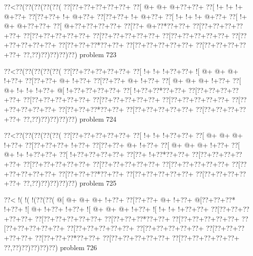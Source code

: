 \vbox{\vbox{\goo
\0??<\0??(\0??(\0??(\0??(\0??(
\0??[\0??+\0??+\0??+\0??+\0??+
\0??[\- @+\- @+\- @+\0??+\0??+
\0??[\- !+\- !+\- !+\- @+\0??+
\0??[\0??+\0??+\- !+\- @+\0??+
\0??[\0??+\0??+\- !+\- @+\0??+
\0??[\- !+\- !+\- !+\- @+\0??+
\0??[\- !+\- @+\- @+\0??+\0??+
\0??[\- @+\0??+\0??+\0??+\0??+
\0??[\0??+\- @+\0??*\0??+\0??+
\0??[\0??+\0??+\0??+\0??+\0??+
\0??[\0??+\0??+\0??+\0??+\0??+
\0??[\0??+\0??+\0??+\0??+\0??+
\0??[\0??+\0??+\0??+\0??+\0??+
\0??[\0??+\0??+\0??+\0??+\0??+
\0??[\0??+\0??+\0??*\0??+\0??+
\0??[\0??+\0??+\0??+\0??+\0??+
\0??[\0??+\0??+\0??+\0??+\0??+
\0??,\0??)\0??)\0??)\0??)\0??)
}
\hfil problem 723\hfil\break
}

\vbox{\vbox{\goo
\0??<\0??(\0??(\0??(\0??(\0??(
\0??[\0??+\0??+\0??+\0??+\0??+
\0??[\- !+\- !+\- !+\0??+\0??+
\- ![\- @+\- @+\- @+\- !+\0??+
\0??[\0??+\0??+\- @+\- !+\0??+
\0??[\0??+\0??+\- @+\- !+\0??+
\0??[\- @+\- @+\- @+\- !+\0??+
\0??[\- @+\- !+\- !+\- !+\0??+
\- @[\- !+\0??+\0??+\0??+\0??+
\0??[\- !+\0??+\0??*\0??+\0??+
\0??[\0??+\0??+\0??+\0??+\0??+
\0??[\0??+\0??+\0??+\0??+\0??+
\0??[\0??+\0??+\0??+\0??+\0??+
\0??[\0??+\0??+\0??+\0??+\0??+
\0??[\0??+\0??+\0??+\0??+\0??+
\0??[\0??+\0??+\0??*\0??+\0??+
\0??[\0??+\0??+\0??+\0??+\0??+
\0??[\0??+\0??+\0??+\0??+\0??+
\0??,\0??)\0??)\0??)\0??)\0??)
}
\hfil problem 724\hfil\break
}

\vbox{\vbox{\goo
\0??<\0??(\0??(\0??(\0??(\0??(
\0??[\0??+\0??+\0??+\0??+\0??+
\0??[\- !+\- !+\- !+\0??+\0??+
\0??[\- @+\- @+\- @+\- !+\0??+
\0??[\0??+\0??+\0??+\- !+\0??+
\0??[\0??+\0??+\- @+\- !+\0??+
\0??[\- @+\- @+\- @+\- !+\0??+
\0??[\- @+\- !+\- !+\0??+\0??+
\0??[\- !+\0??+\0??+\0??+\0??+
\0??[\0??+\- !+\0??*\0??+\0??+
\0??[\0??+\0??+\0??+\0??+\0??+
\0??[\0??+\0??+\0??+\0??+\0??+
\0??[\0??+\0??+\0??+\0??+\0??+
\0??[\0??+\0??+\0??+\0??+\0??+
\0??[\0??+\0??+\0??+\0??+\0??+
\0??[\0??+\0??+\0??*\0??+\0??+
\0??[\0??+\0??+\0??+\0??+\0??+
\0??[\0??+\0??+\0??+\0??+\0??+
\0??,\0??)\0??)\0??)\0??)\0??)
}
\hfil problem 725\hfil\break
}

\vbox{\vbox{\goo
\0??<\- !(\- !(\- !(\0??(\0??(
\- @[\- @+\- @+\- @+\- !+\0??+
\0??[\0??+\0??+\- @+\- !+\0??+
\- @[\0??+\0??+\0??*\- !+\0??+
\- ![\- @+\- !+\0??+\- !+\0??+
\- ![\- @+\- @+\- @+\- !+\0??+
\- ![\- !+\- !+\- !+\0??+\0??+
\0??[\0??+\0??+\0??+\0??+\0??+
\0??[\0??+\0??+\0??+\0??+\0??+
\0??[\0??+\0??+\0??*\0??+\0??+
\0??[\0??+\0??+\0??+\0??+\0??+
\0??[\0??+\0??+\0??+\0??+\0??+
\0??[\0??+\0??+\0??+\0??+\0??+
\0??[\0??+\0??+\0??+\0??+\0??+
\0??[\0??+\0??+\0??+\0??+\0??+
\0??[\0??+\0??+\0??*\0??+\0??+
\0??[\0??+\0??+\0??+\0??+\0??+
\0??[\0??+\0??+\0??+\0??+\0??+
\0??,\0??)\0??)\0??)\0??)\0??)
}
\hfil problem 726\hfil\break
}

